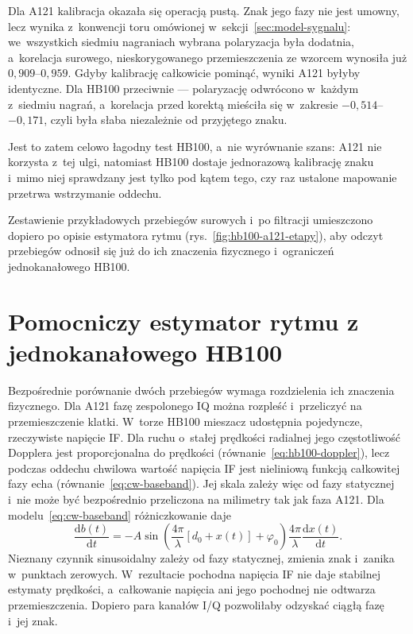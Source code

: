 \documentclass[12pt,a4paper,oneside]{report}
\begin{document}
Dla A121 kalibracja okazała się operacją pustą. Znak jego fazy nie jest umowny,
lecz wynika z~konwencji toru omówionej w~sekcji~\ref{sec:model-sygnalu}:
we~wszystkich siedmiu nagraniach wybrana polaryzacja była dodatnia,
a~korelacja surowego, nieskorygowanego przemieszczenia ze wzorcem wynosiła już
$0{,}909$--$0{,}959$. Gdyby kalibrację całkowicie pominąć, wyniki A121 byłyby
identyczne. Dla HB100 przeciwnie --- polaryzację odwrócono w~każdym z~siedmiu
nagrań, a~korelacja przed korektą mieściła się w~zakresie
$-0{,}514$--$-0{,}171$, czyli była słaba niezależnie od przyjętego znaku.

Jest to zatem celowo łagodny test HB100, a~nie wyrównanie szans: A121 nie
korzysta z~tej ulgi, natomiast HB100 dostaje jednorazową kalibrację znaku
i~mimo niej sprawdzany jest tylko pod kątem tego, czy raz ustalone mapowanie
przetrwa wstrzymanie oddechu.

Zestawienie przykładowych przebiegów surowych i~po filtracji umieszczono
dopiero po opisie estymatora rytmu (rys.~\ref{fig:hb100-a121-etapy}), aby
odczyt przebiegów odnosił się już do ich znaczenia fizycznego i~ograniczeń
jednokanałowego HB100.

\section{Pomocniczy estymator rytmu z jednokanałowego HB100}
\label{sec:hb100-rytm}

Bezpośrednie porównanie dwóch przebiegów wymaga rozdzielenia ich znaczenia
fizycznego. Dla A121 fazę zespolonego IQ można rozpleść i~przeliczyć na
przemieszczenie klatki. W~torze HB100 mieszacz udostępnia pojedyncze,
rzeczywiste napięcie IF. Dla ruchu o~stałej prędkości radialnej jego
częstotliwość Dopplera jest proporcjonalna do prędkości
(równanie~\eqref{eq:hb100-doppler}), lecz podczas oddechu chwilowa wartość
napięcia IF jest nieliniową funkcją całkowitej fazy echa
(równanie~\eqref{eq:cw-baseband}). Jej skala zależy więc od fazy statycznej
i~nie może być bezpośrednio przeliczona na milimetry tak jak faza A121.
Dla modelu~\eqref{eq:cw-baseband} różniczkowanie daje
\begin{equation}
  \frac{\mathrm{d}b(t)}{\mathrm{d}t}
  =-A\sin\!\left(\frac{4\pi}{\lambda}[d_0+x(t)]+\varphi_0\right)
  \frac{4\pi}{\lambda}\frac{\mathrm{d}x(t)}{\mathrm{d}t}.
  \label{eq:hb100-pochodna-if}
\end{equation}
Nieznany czynnik sinusoidalny zależy od fazy statycznej, zmienia znak i~zanika
w~punktach zerowych. W~rezultacie pochodna napięcia IF nie daje stabilnej
estymaty prędkości, a~całkowanie napięcia ani jego pochodnej nie odtwarza
przemieszczenia. Dopiero para kanałów I/Q pozwoliłaby odzyskać ciągłą fazę
i~jej znak.
\end{document}
